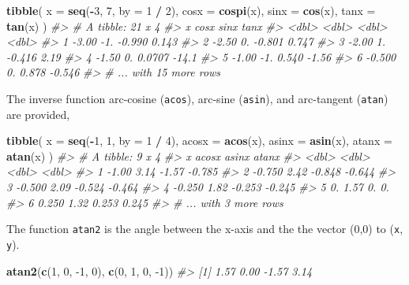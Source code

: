\documentclass[]{book}
\newenvironment{Shaded}{\begin{snugshade}}{\end{snugshade}}
\newcommand{\CommentTok}[1]{\textcolor[rgb]{0.56,0.35,0.01}{\textit{#1}}}
\newcommand{\DataTypeTok}[1]{\textcolor[rgb]{0.13,0.29,0.53}{#1}}
\newcommand{\DecValTok}[1]{\textcolor[rgb]{0.00,0.00,0.81}{#1}}
\newcommand{\KeywordTok}[1]{\textcolor[rgb]{0.13,0.29,0.53}{\textbf{#1}}}
\newcommand{\NormalTok}[1]{#1}
\newcommand{\OperatorTok}[1]{\textcolor[rgb]{0.81,0.36,0.00}{\textbf{#1}}}
\newcommand{\StringTok}[1]{\textcolor[rgb]{0.31,0.60,0.02}{#1}}
\theoremstyle{definition}
\theoremstyle{definition}
\theoremstyle{definition}
\theoremstyle{remark}
\begin{document}
\begin{Shaded}
\begin{Highlighting}[]
\KeywordTok{tibble}\NormalTok{(}
  \DataTypeTok{x =} \KeywordTok{seq}\NormalTok{(}\OperatorTok{-}\DecValTok{3}\NormalTok{, }\DecValTok{7}\NormalTok{, }\DataTypeTok{by =} \DecValTok{1} \OperatorTok{/}\StringTok{ }\DecValTok{2}\NormalTok{),}
  \DataTypeTok{cosx =} \KeywordTok{cospi}\NormalTok{(x),}
  \DataTypeTok{sinx =} \KeywordTok{cos}\NormalTok{(x),}
  \DataTypeTok{tanx =} \KeywordTok{tan}\NormalTok{(x)}
\NormalTok{)}
\CommentTok{#> # A tibble: 21 x 4}
\CommentTok{#>        x  cosx    sinx    tanx}
\CommentTok{#>    <dbl> <dbl>   <dbl>   <dbl>}
\CommentTok{#> 1 -3.00    -1. -0.990    0.143}
\CommentTok{#> 2 -2.50     0. -0.801    0.747}
\CommentTok{#> 3 -2.00     1. -0.416    2.19 }
\CommentTok{#> 4 -1.50     0.  0.0707 -14.1  }
\CommentTok{#> 5 -1.00    -1.  0.540   -1.56 }
\CommentTok{#> 6 -0.500    0.  0.878   -0.546}
\CommentTok{#> # ... with 15 more rows}
\end{Highlighting}
\end{Shaded}

The inverse function arc-cosine (\texttt{acos}), arc-sine
(\texttt{asin}), and arc-tangent (\texttt{atan}) are provided,

\begin{Shaded}
\begin{Highlighting}[]
\KeywordTok{tibble}\NormalTok{(}
  \DataTypeTok{x =} \KeywordTok{seq}\NormalTok{(}\OperatorTok{-}\DecValTok{1}\NormalTok{, }\DecValTok{1}\NormalTok{, }\DataTypeTok{by =} \DecValTok{1} \OperatorTok{/}\StringTok{ }\DecValTok{4}\NormalTok{),}
  \DataTypeTok{acosx =} \KeywordTok{acos}\NormalTok{(x),}
  \DataTypeTok{asinx =} \KeywordTok{asin}\NormalTok{(x),}
  \DataTypeTok{atanx =} \KeywordTok{atan}\NormalTok{(x)}
\NormalTok{)}
\CommentTok{#> # A tibble: 9 x 4}
\CommentTok{#>        x acosx  asinx  atanx}
\CommentTok{#>    <dbl> <dbl>  <dbl>  <dbl>}
\CommentTok{#> 1 -1.00   3.14 -1.57  -0.785}
\CommentTok{#> 2 -0.750  2.42 -0.848 -0.644}
\CommentTok{#> 3 -0.500  2.09 -0.524 -0.464}
\CommentTok{#> 4 -0.250  1.82 -0.253 -0.245}
\CommentTok{#> 5  0.     1.57  0.     0.   }
\CommentTok{#> 6  0.250  1.32  0.253  0.245}
\CommentTok{#> # ... with 3 more rows}
\end{Highlighting}
\end{Shaded}

The function \texttt{atan2} is the angle between the x-axis and the the
vector (0,0) to (\texttt{x}, \texttt{y}).

\begin{Shaded}
\begin{Highlighting}[]
\KeywordTok{atan2}\NormalTok{(}\KeywordTok{c}\NormalTok{(}\DecValTok{1}\NormalTok{, }\DecValTok{0}\NormalTok{, }\DecValTok{-1}\NormalTok{, }\DecValTok{0}\NormalTok{), }\KeywordTok{c}\NormalTok{(}\DecValTok{0}\NormalTok{, }\DecValTok{1}\NormalTok{, }\DecValTok{0}\NormalTok{, }\DecValTok{-1}\NormalTok{))}
\CommentTok{#> [1]  1.57  0.00 -1.57  3.14}
\end{Highlighting}
\end{Shaded}
\end{document}
